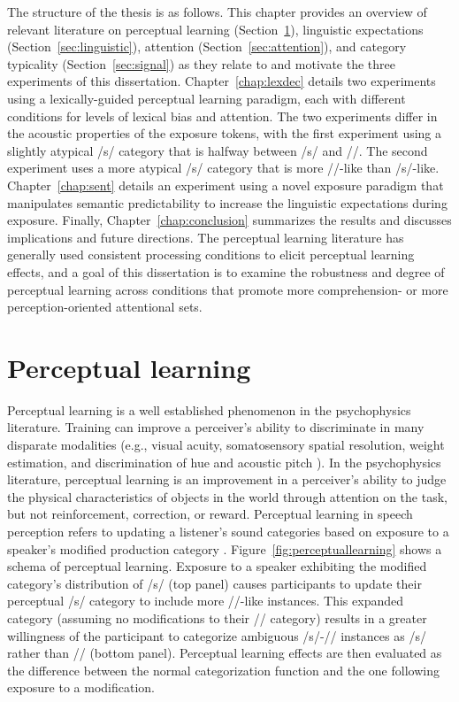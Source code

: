 The structure of the thesis is as follows.
This chapter provides an overview of relevant literature on perceptual learning (Section~\ref{sec:perceptuallearning}), linguistic expectations (Section~\ref{sec:linguistic}), attention (Section~\ref{sec:attention}), and category typicality (Section~\ref{sec:signal}) as they relate to and motivate the three experiments of this dissertation.
Chapter~\ref{chap:lexdec} details two experiments using a lexically-guided perceptual learning paradigm, each with different conditions for levels of lexical bias and attention.  
The two experiments differ in the acoustic properties of the exposure tokens, with the first experiment using a slightly atypical /s/ category that is halfway between /s/ and /\textesh/.
The second experiment uses a more atypical /s/ category that is more /\textesh/-like than /s/-like.  
Chapter~\ref{chap:sent} details an experiment using a novel exposure paradigm that manipulates semantic predictability to increase the linguistic expectations during exposure.
Finally, Chapter~\ref{chap:conclusion} summarizes the results and discusses implications and future directions.
The perceptual learning literature has generally used consistent processing conditions to elicit perceptual learning effects, and a goal of this dissertation is to examine the robustness and degree of perceptual learning across conditions that promote more comprehension- or more perception-oriented attentional sets.

\section{Perceptual learning}
\label{sec:perceptuallearning}

Perceptual learning is a well established phenomenon in the psychophysics literature. 
Training can improve a perceiver's ability to discriminate in many disparate modalities (e.g., visual acuity, somatosensory spatial resolution, weight estimation, and discrimination of hue and acoustic pitch \citep[see][for review]{Gibson1953}). 
In the psychophysics literature, perceptual learning is an improvement in a perceiver's ability to judge the physical characteristics of objects in the world through attention on the task, but not reinforcement, correction, or reward.
Perceptual learning in speech perception refers to updating a listener's sound categories based on exposure to a speaker's modified production category \citep{Norris2003, Vroomen2007}.
Figure~\ref{fig:perceptuallearning} shows a schema of perceptual learning.
Exposure to a speaker exhibiting the modified category's distribution of /s/ (top panel) causes participants to update their perceptual /s/ category to include more /\textesh/-like instances.
This expanded category (assuming no modifications to their /\textesh/ category) results in a greater willingness of the participant to categorize ambiguous /s/-/\textesh/ instances as /s/ rather than /\textesh/ (bottom panel).
Perceptual learning effects are then evaluated as the difference between the normal categorization function and the one following exposure to a modification.

